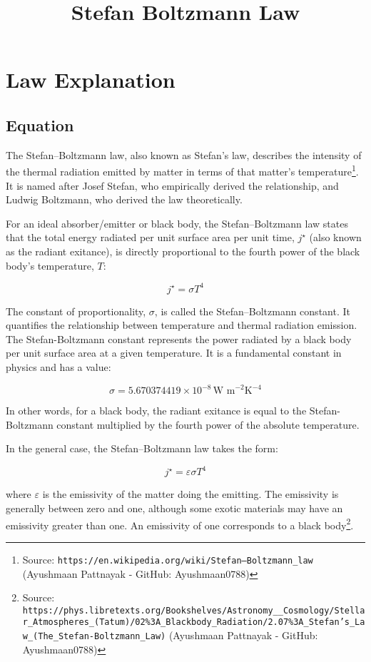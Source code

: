 \documentclass{article}
\title{Stefan Boltzmann Law}
\author{}
\date{}
\begin{document}
\maketitle

\section{Law Explanation}

\subsection*{Equation}

The Stefan--Boltzmann law, also known as Stefan's law, describes the intensity of the thermal radiation emitted by matter in terms of that matter's temperature\footnote{Source: \texttt{https://en.wikipedia.org/wiki/Stefan–Boltzmann\_law} (Ayushmaan Pattnayak - GitHub: Ayushmaan0788)}. It is named after Josef Stefan, who empirically derived the relationship, and Ludwig Boltzmann, who derived the law theoretically.

For an ideal absorber/emitter or black body, the Stefan--Boltzmann law states that the total energy radiated per unit surface area per unit time, $j^{\star}$ (also known as the radiant exitance), is directly proportional to the fourth power of the black body's temperature, $T$:

\begin{equation}
    j^{\star} = \sigma T^4 \label{eq:stefan-boltzmann}
\end{equation}

The constant of proportionality, $\sigma$, is called the Stefan--Boltzmann constant. It quantifies the relationship between temperature and thermal radiation emission. The Stefan-Boltzmann constant represents the power radiated by a black body per unit surface area at a given temperature. It is a fundamental constant in physics and has a value:

\begin{equation}
    \sigma = 5.670374419 \times 10^{-8} \, \text{W m}^{-2} \text{K}^{-4} \label{eq:stefan-boltzmann-constant}
\end{equation}

In other words, for a black body, the radiant exitance is equal to the Stefan-Boltzmann constant multiplied by the fourth power of the absolute temperature.

In the general case, the Stefan--Boltzmann law takes the form:

\begin{equation}
    j^{\star} = \varepsilon \sigma T^4 \label{eq:general-stefan-boltzmann}
\end{equation}

where $\varepsilon$ is the emissivity of the matter doing the emitting. The emissivity is generally between zero and one, although some exotic materials may have an emissivity greater than one. An emissivity of one corresponds to a black body\footnote{Source: \texttt{https://phys.libretexts.org/Bookshelves/Astronomy\_\_Cosmology/Stellar\_Atmospheres\_(Tatum)/02\%3A\_Blackbody\_Radiation/2.07\%3A\_Stefan's\_Law\_(The\_Stefan-Boltzmann\_Law)} (Ayushmaan Pattnayak - GitHub: Ayushmaan0788)}.
\end{document}
